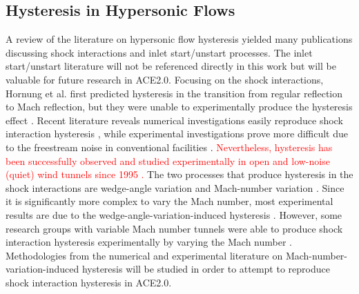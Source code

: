 \subsection{Hysteresis in Hypersonic Flows}
A review of the literature on hypersonic flow hysteresis yielded many publications discussing shock interactions and inlet start/unstart processes. The inlet start/unstart literature will not be referenced directly in this work but will be valuable for future research in ACE2.0. Focusing on the shock interactions, Hornung et al. \cite{hornung-1} first predicted hysteresis in the transition from regular reflection to Mach reflection, but they were unable to experimentally produce the hysteresis effect \cite{hornung-2}. Recent literature reveals numerical investigations easily reproduce shock interaction hysteresis \cite{chpoun-1,ivanov-3}, while experimental investigations prove more difficult due to the freestream noise in conventional facilities \cite{ben-dor-1,laguarda}. \textcolor{red}{Nevertheless, hysteresis has been successfully observed and studied experimentally in open and low-noise (quiet) wind tunnels since 1995 \cite{chpoun-2}.} The two processes that produce hysteresis in the shock interactions are wedge-angle variation and Mach-number variation \cite{ben-dor-2}. Since it is significantly more complex to vary the Mach number, most experimental results are due to the wedge-angle-variation-induced hysteresis \cite{li,ivanov-4,mouton,setoguchi,chanetz}. However, some research groups with variable Mach number tunnels were able to produce shock interaction hysteresis experimentally by varying the Mach number \cite{durand,tao}. Methodologies from the numerical and experimental literature on Mach-number-variation-induced hysteresis will be studied in order to attempt to reproduce shock interaction hysteresis in ACE2.0.

